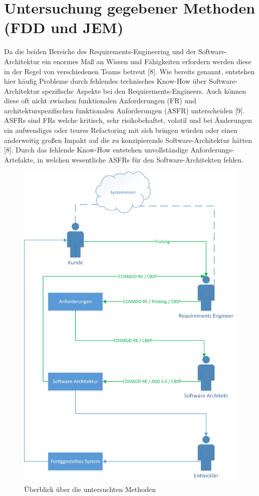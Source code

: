\section{Untersuchung gegebener Methoden (FDD und JEM)}

Da die beiden Bereiche des Requirements-Engineering und der Software-Architektur ein enormes Maß an Wissen und Fähigkeiten erfordern werden diese in der Regel von verschiedenen Teams betreut [8]. Wie bereits genannt, entstehen hier häufig Probleme durch fehlendes technisches Know-How über Software-Architektur spezifische Aspekte bei den Requirements-Engineers. Auch können diese oft nicht zwischen funktionalen Anforderungen (FR) und architekturspezifischen funktionalen Anforderungen (ASFR) unterscheiden [9]. ASFRs sind FRs welche kritisch, sehr risikobehaftet, volatil und bei Änderungen ein aufwendiges oder teures Refactoring mit sich bringen würden oder einen anderweitig großen Impakt auf die zu konzipierende Software-Architektur hätten [8]. Durch das fehlende Know-How entstehen unvollständige Anforderungs-Artefakte, in welchen wesentliche ASFRs für den Software-Architekten fehlen. \\

\begin{figure}[h]
	\centering
	\includegraphics[scale=0.5]{methoden.jpg} 
	\caption{Überblick über die untersuchten Methoden}\label{methoden}
\end{figure}

